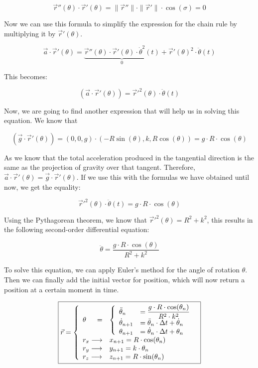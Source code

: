\documentclass[12pt,twoside,a4paper]{article}
\newcommand{\ds}{\displaystyle}
\begin{document}
	$$\vec{r}''(\theta) \cdot \vec{r}'(\theta) = \|\vec{r}''\| \cdot \|\vec{r}'\| \cdot \cos(\sigma) = 0$$
	
	Now we can use this formula to simplify the expression for the chain rule by multiplying it by $\vec{r}'(\theta)$.
	
	$$\vec{a} \cdot \vec{r}'(\theta) = \underset{0}{\underbrace{\vec{r}''(\theta) \cdot \vec{r}'(\theta) \cdot \dot{\theta}^2(t)}} + \vec{r}'(\theta)^2 \cdot \ddot{\theta}(t)$$
	
	This becomes:
	
	$$\boxed{(\vec{a} \cdot \vec{r}'(\theta))= \vec{r}'^2(\theta) \cdot \ddot{\theta}(t)}$$
	
	Now, we are going to find another expression that will help us in solving this equation. We know that 
	
	$$(\vec{g} \cdot \vec{r}'(\theta)) = (0, 0, g) \cdot (- R \sin(\theta), k, R \cos(\theta)) = g \cdot R \cdot \cos(\theta)$$
	
	As we know that the total acceleration produced in the tangential direction is the same as the projection of gravity over that tangent. Therefore, $\vec{a} \cdot \vec{r}'(\theta) = \vec{g} \cdot \vec{r}'(\theta)$. If we use this with the formulas we have obtained until now, we get the equality:
	
	$$\vec{r}'^2(\theta) \cdot \ddot{\theta}(t) = g \cdot R\cdot\cos(\theta)$$
	
	Using the Pythagorean theorem, we know that $\vec{r}'^2(\theta) = R^2 + k^2$, this results in the following second-order differential equation:
	
	$$\ddot\theta = \frac{g \cdot R \cdot \cos(\theta)}{R^2 + k^2}$$
	
	To solve this equation, we can apply Euler's method for the angle of rotation $\theta$. Then we can finally add the initial vector for position, which will now return a position at a certain moment in time.
	
	$$\boxed{\vec{r} = \left\{\begin{array}{ll}
			\theta \hfill =& \left\{\begin{array}{ll}
				\ddot{\theta}_n &= \ds \frac{g \cdot R \cdot \cos(\theta_n)}{R^2 \cdot k^2} \cr
				\dot{\theta}_{n + 1} &= \ddot{\theta}_n \cdot \Delta t + \dot{\theta}_n \cr
				\theta_{n + 1} &= \dot{\theta}_n \cdot \Delta t + \theta_n
			\end{array}\right. \cr
			r_x \longrightarrow & x_{n + 1} = R \cdot \cos(\theta_n) \cr
			r_y \longrightarrow & y_{n + 1} = k \cdot \theta_n \cr
			r_z \longrightarrow & z_{n + 1} = R \cdot \sin(\theta_n) \cr
		\end{array}\right.}$$
\end{document}
